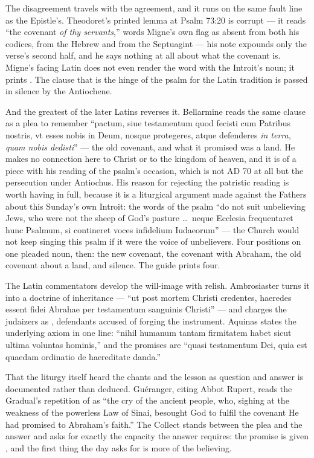 The disagreement travels with the agreement, and it runs on the same fault line
as the Epistle's. Theodoret's printed lemma at Psalm 73:20 is corrupt --- it
reads ``the covenant \emph{of thy servants},'' words Migne's own  flag as absent from both his codices, from the Hebrew and from the
Septuagint --- his note expounds only the verse's second half, and he says
nothing at all about what the covenant is. Migne's facing Latin does not even
render the word with the Introit's noun; it prints . The clause
that is the hinge of the psalm for the Latin tradition is passed in silence by
the Antiochene.

And the greatest of the later Latins reverses it. Bellarmine reads the same
clause as a plea to remember ``pactum, siue testamentum quod fecisti cum
Patribus nostris, vt esses nobis in Deum, nosque protegeres, atque defenderes
\emph{in terra, quam nobis dedisti}'' --- the old covenant, and what it promised
was a land. He makes no connection here to Christ or to the kingdom of heaven,
and it is of a piece with his reading of the psalm's occasion, which is not AD
70 at all but the persecution under Antiochus. His reason for rejecting the
patristic reading is worth having in full, because it is a liturgical argument
made against the Fathers about this Sunday's own Introit: the words of the
psalm ``do not suit unbelieving Jews, who were not the sheep of God's pasture
\dots\ neque Ecclesia frequentaret hunc Psalmum, si contineret voces infidelium
Iudaeorum'' --- the Church would not keep singing this psalm if it were the
voice of unbelievers. Four positions on one pleaded noun, then: the new
covenant, the covenant with Abraham, the old covenant about a land, and
silence. The guide prints four.

The Latin commentators develop the will-image with relish. Ambrosiaster turns
it into a doctrine of inheritance --- ``ut post mortem Christi credentes,
haeredes essent fidei Abrahae per testamentum sanguinis Christi'' --- and
charges the judaizers as , defendants
accused of forging the instrument. Aquinas states the underlying axiom in one
line: ``nihil humanum tantam firmitatem habet sicut ultima voluntas hominis,''
and the promises are ``quasi testamentum Dei, quia est quaedam ordinatio de
haereditate danda.''

That the liturgy itself heard the chants and the lesson as question and answer
is documented rather than deduced. Guéranger, citing Abbot Rupert, reads the
Gradual's repetition of  as ``the cry
of the ancient people, who, sighing at the weakness of the powerless Law of
Sinai, besought God to fulfil the covenant He had promised to Abraham's
faith.'' The Collect stands between the plea and the answer and asks for
exactly the capacity the answer requires: the promise is given
, and the first thing the day asks for is more of the
believing.

